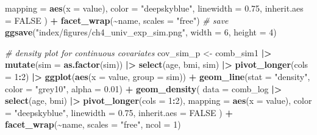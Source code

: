 \documentclass[12pt, twoside]{amherstthesis}
\newenvironment{Shaded}{\begin{snugshade}}{\end{snugshade}}
\newcommand{\AttributeTok}[1]{\textcolor[rgb]{0.13,0.29,0.53}{#1}}
\newcommand{\CommentTok}[1]{\textcolor[rgb]{0.56,0.35,0.01}{\textit{#1}}}
\newcommand{\ConstantTok}[1]{\textcolor[rgb]{0.56,0.35,0.01}{#1}}
\newcommand{\DecValTok}[1]{\textcolor[rgb]{0.00,0.00,0.81}{#1}}
\newcommand{\FloatTok}[1]{\textcolor[rgb]{0.00,0.00,0.81}{#1}}
\newcommand{\FunctionTok}[1]{\textcolor[rgb]{0.13,0.29,0.53}{\textbf{#1}}}
\newcommand{\NormalTok}[1]{#1}
\newcommand{\OtherTok}[1]{\textcolor[rgb]{0.56,0.35,0.01}{#1}}
\newcommand{\SpecialCharTok}[1]{\textcolor[rgb]{0.81,0.36,0.00}{\textbf{#1}}}
\newcommand{\StringTok}[1]{\textcolor[rgb]{0.31,0.60,0.02}{#1}}
\begin{document}
\begin{Shaded}
\begin{Highlighting}[]
    \AttributeTok{mapping =} \FunctionTok{aes}\NormalTok{(}\AttributeTok{x =}\NormalTok{ value), }
    \AttributeTok{color =} \StringTok{"deepskyblue"}\NormalTok{, }\AttributeTok{linewidth =} \FloatTok{0.75}\NormalTok{, }\AttributeTok{inherit.aes =} \ConstantTok{FALSE}
\NormalTok{  ) }\SpecialCharTok{+}
  \FunctionTok{facet\_wrap}\NormalTok{(}\SpecialCharTok{\textasciitilde{}}\NormalTok{name, }\AttributeTok{scales =} \StringTok{"free"}\NormalTok{)}
\CommentTok{\# save}
\FunctionTok{ggsave}\NormalTok{(}\StringTok{"index/figures/ch4\_univ\_exp\_sim.png"}\NormalTok{, }\AttributeTok{width =} \DecValTok{6}\NormalTok{, }\AttributeTok{height =} \DecValTok{4}\NormalTok{)}
\end{Highlighting}
\end{Shaded}
\normalsize

\scriptsize
\begin{Shaded}
\begin{Highlighting}[]
\CommentTok{\# density plot for continuous covariates}
\NormalTok{cov\_sim\_p }\OtherTok{\textless{}{-}}\NormalTok{ comb\_sim1 }\SpecialCharTok{|\textgreater{}} 
  \FunctionTok{mutate}\NormalTok{(}\AttributeTok{sim =} \FunctionTok{as.factor}\NormalTok{(sim)) }\SpecialCharTok{|\textgreater{}} 
  \FunctionTok{select}\NormalTok{(age, bmi, sim) }\SpecialCharTok{|\textgreater{}} 
  \FunctionTok{pivot\_longer}\NormalTok{(}\AttributeTok{cols =} \DecValTok{1}\SpecialCharTok{:}\DecValTok{2}\NormalTok{) }\SpecialCharTok{|\textgreater{}}
  \FunctionTok{ggplot}\NormalTok{(}\FunctionTok{aes}\NormalTok{(}\AttributeTok{x =}\NormalTok{ value, }\AttributeTok{group =}\NormalTok{ sim)) }\SpecialCharTok{+}
  \FunctionTok{geom\_line}\NormalTok{(}\AttributeTok{stat =} \StringTok{"density"}\NormalTok{, }\AttributeTok{color =} \StringTok{"grey10"}\NormalTok{, }\AttributeTok{alpha =} \FloatTok{0.01}\NormalTok{) }\SpecialCharTok{+} 
  \FunctionTok{geom\_density}\NormalTok{(}
    \AttributeTok{data =}\NormalTok{ comb\_log }\SpecialCharTok{|\textgreater{}} \FunctionTok{select}\NormalTok{(age, bmi) }\SpecialCharTok{|\textgreater{}} \FunctionTok{pivot\_longer}\NormalTok{(}\AttributeTok{cols =} \DecValTok{1}\SpecialCharTok{:}\DecValTok{2}\NormalTok{),}
    \AttributeTok{mapping =} \FunctionTok{aes}\NormalTok{(}\AttributeTok{x =}\NormalTok{ value), }
    \AttributeTok{color =} \StringTok{"deepskyblue"}\NormalTok{, }\AttributeTok{linewidth =} \FloatTok{0.75}\NormalTok{, }\AttributeTok{inherit.aes =} \ConstantTok{FALSE}
\NormalTok{  ) }\SpecialCharTok{+}
  \FunctionTok{facet\_wrap}\NormalTok{(}\SpecialCharTok{\textasciitilde{}}\NormalTok{name, }\AttributeTok{scales =} \StringTok{"free"}\NormalTok{, }\AttributeTok{ncol =} \DecValTok{1}\NormalTok{)}


\end{Highlighting}
\end{Shaded}
\end{document}
